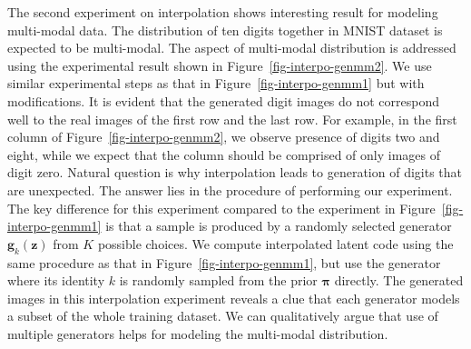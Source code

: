 The second experiment on interpolation shows interesting result for
modeling multi-modal data. The distribution of ten digits together in
MNIST dataset is expected to be multi-modal. The aspect of multi-modal
distribution is addressed using the experimental result shown in
Figure~\ref{fig-interpo-genmm2}. We use similar experimental steps
as that in Figure~\ref{fig-interpo-genmm1} but with modifications. It
is evident that the generated digit images do not correspond well to
the real images of the first row and the last row. For example, in the
first column of Figure~\ref{fig-interpo-genmm2}, we observe
presence of digits two and eight, while we expect that the
column should be comprised of only images of digit zero. Natural
question is why interpolation leads to generation of digits that are
unexpected. The answer lies in the procedure of performing our
experiment. The key difference for this experiment compared to the
experiment in Figure~\ref{fig-interpo-genmm1} is that a sample is
produced by a randomly selected generator $\bm{g}_k(\bm{z})$ from $K$
possible choices. We compute interpolated latent code using the same
procedure as that in Figure~\ref{fig-interpo-genmm1}, but use the generator where its identity $k$ is randomly sampled from the prior $\bm{\pi}$ directly. The generated images in this interpolation experiment reveals a clue that each generator models a subset of the whole training dataset. We can qualitatively argue that use of multiple generators helps for modeling the multi-modal distribution.  

